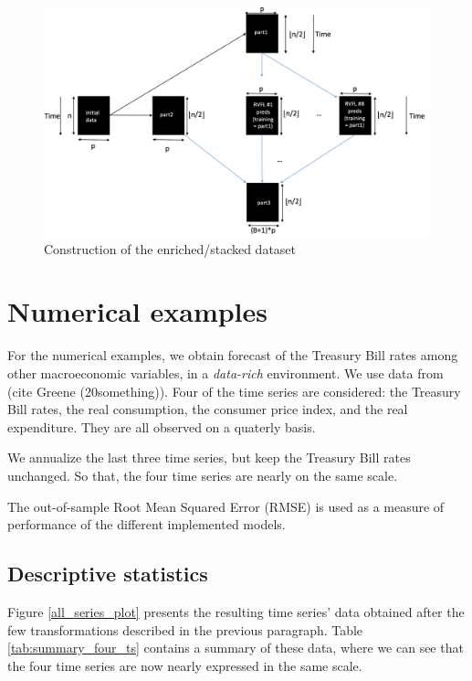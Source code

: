 \begin{figure}[!htb]
\centering
\includegraphics[width=13cm]{gfx/chapter-rvfl-ensembles/rvfl_stacking.png}
\caption{Construction of the enriched/stacked dataset}
\label{rvfl_stacking_plot}
\end{figure}


\section{Numerical examples}
\label{sec:numericalexamples}

For the numerical examples, we obtain forecast of the Treasury Bill rates among other macroeconomic variables, in a \textit{data-rich} environment. We use data from (cite Greene (20something)). Four of the time series are considered: the Treasury Bill rates, the real consumption, the consumer price index, and the real expenditure. They are all observed on a quaterly basis. 

We annualize the last three time series, but keep the Treasury Bill rates unchanged. So that, the four time series are nearly on the same scale.

The out-of-sample Root Mean Squared Error (RMSE) is used as a measure of performance of the different implemented models.

\subsection{Descriptive statistics}

Figure \ref{all_series_plot} presents the resulting time series' data obtained after the few transformations described in the previous paragraph. Table \ref{tab:summary_four_ts} contains a summary of these data, where we can see that the four time series are now nearly expressed in the same scale.

